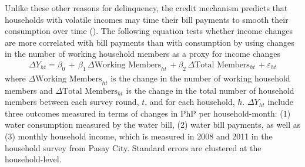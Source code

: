 \documentclass[12pt,table]{article}
\begin{document}


Unlike these other reasons for delinquency, the credit mechanism predicts that households with volatile incomes may time their bill payments to smooth their consumption over time (\cite{deaton1991saving}).  The following equation tests whether income changes are more correlated with bill payments than with consumption by using changes in the number of working household members as a proxy for income changes
\begin{align*}
\Delta Y_{ht} =\beta_0\,+\, \beta_1\, \Delta \text{Working Members}_{ht} \, + \beta_2\, \Delta \text{Total Members}_{ht}   \,+\varepsilon_{ht}
\end{align*}
where $ \Delta \text{Working Members}_{ht} $ is the change in the number of working household members and $\Delta \text{Total Members}_{ht}$ is the change in the total number of household members between each survey round, $t$, and for each household, $h$.  $\Delta Y_{ht}$ include three outcomes measured in terms of changes in PhP per household-month: (1) water consumption measured by the water bill, (2) water bill payments, as well as (3) monthly household income, which is measured in 2008 and 2011 in the household survey from Pasay City.  Standard errors are clustered at the household-level.
\end{document}
